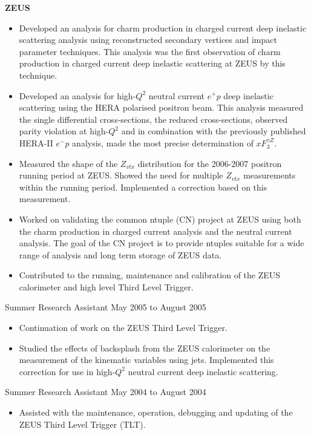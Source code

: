 \documentclass[margin]{res}
\begin{document}
\begin{resume}
\textbf{ZEUS}

\begin{itemize}
\item Developed an analysis for charm production in charged current deep inelastic scattering analysis using reconstructed secondary vertices and impact parameter techniques.  This analysis was the first observation of charm production in charged current deep inelastic scattering at ZEUS by this technique.
\item Developed an analysis for high-$Q^2$ neutral current $e^{+}p $ deep inelastic scattering using the HERA polarised positron beam.  This analysis measured the single differential cross-sections, the reduced cross-sections, observed parity violation at high-$Q^2$ and in combination with the previously published HERA-II $e^{-}p$ analysis, made the most precise determination of $xF_3^{\gamma Z}$.  
\item Measured the shape of the $Z_{vtx}$ distribution for the 2006-2007 positron running period at ZEUS.  Showed the need for multiple $Z_{vtx}$ measurements within the running period.  Implemented a correction based on this measurement.
\item Worked on validating the common ntuple (CN) project at ZEUS  using both the charm production in charged current analysis and the neutral current analysis.  The goal of the CN project is to provide ntuples suitable for a wide range of analysis and long term storage of ZEUS data.
\item Contributed to the running, maintenance and calibration of the ZEUS calorimeter and high level Third Level Trigger. 
\end{itemize}

Summer Research Assistant \hfill May 2005 to August 2005\\

\begin{itemize}
  \item Continuation of work on the ZEUS Third Level Trigger.
  \item Studied the effects of backsplash from the ZEUS calorimeter on the measurement of the kinematic variables using jets.  Implemented this correction for use in high-$Q^2$ neutral current deep inelastic scattering.
\end{itemize}

Summer Research Assistant \hfill May 2004 to August 2004 \\

\begin{itemize}
\item Assisted with the maintenance, operation, debugging and updating of the ZEUS Third Level Trigger (TLT). 
\end{itemize}


\end{resume}
\end{document}

